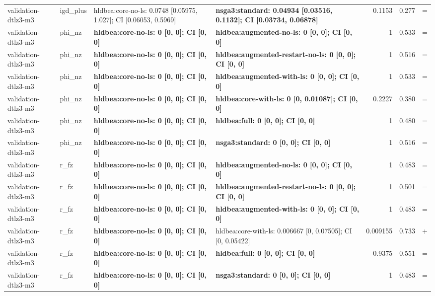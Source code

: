 \begin{tabular}{llllrrc}
validation-dtlz3-m3 & igd\_plus & hldbea:core-no-ls: 0.0748 [0.05975, 1.027]; CI [0.06053, 0.5969] & \textbf{nsga3:standard: 0.04934 [0.03516, 0.1132]; CI [0.03734, 0.06878]} & 0.1153 & 0.277 & = \\
validation-dtlz3-m3 & phi\_nz & \textbf{hldbea:core-no-ls: 0 [0, 0]; CI [0, 0]} & \textbf{hldbea:augmented-no-ls: 0 [0, 0]; CI [0, 0]} & 1 & 0.533 & = \\
validation-dtlz3-m3 & phi\_nz & \textbf{hldbea:core-no-ls: 0 [0, 0]; CI [0, 0]} & \textbf{hldbea:augmented-restart-no-ls: 0 [0, 0]; CI [0, 0]} & 1 & 0.516 & = \\
validation-dtlz3-m3 & phi\_nz & \textbf{hldbea:core-no-ls: 0 [0, 0]; CI [0, 0]} & \textbf{hldbea:augmented-with-ls: 0 [0, 0]; CI [0, 0]} & 1 & 0.533 & = \\
validation-dtlz3-m3 & phi\_nz & \textbf{hldbea:core-no-ls: 0 [0, 0]; CI [0, 0]} & \textbf{hldbea:core-with-ls: 0 [0, 0.01087]; CI [0, 0]} & 0.2227 & 0.380 & = \\
validation-dtlz3-m3 & phi\_nz & \textbf{hldbea:core-no-ls: 0 [0, 0]; CI [0, 0]} & \textbf{hldbea:full: 0 [0, 0]; CI [0, 0]} & 1 & 0.480 & = \\
validation-dtlz3-m3 & phi\_nz & \textbf{hldbea:core-no-ls: 0 [0, 0]; CI [0, 0]} & \textbf{nsga3:standard: 0 [0, 0]; CI [0, 0]} & 1 & 0.516 & = \\
validation-dtlz3-m3 & r\_fz & \textbf{hldbea:core-no-ls: 0 [0, 0]; CI [0, 0]} & \textbf{hldbea:augmented-no-ls: 0 [0, 0]; CI [0, 0]} & 1 & 0.483 & = \\
validation-dtlz3-m3 & r\_fz & \textbf{hldbea:core-no-ls: 0 [0, 0]; CI [0, 0]} & \textbf{hldbea:augmented-restart-no-ls: 0 [0, 0]; CI [0, 0]} & 1 & 0.501 & = \\
validation-dtlz3-m3 & r\_fz & \textbf{hldbea:core-no-ls: 0 [0, 0]; CI [0, 0]} & \textbf{hldbea:augmented-with-ls: 0 [0, 0]; CI [0, 0]} & 1 & 0.483 & = \\
validation-dtlz3-m3 & r\_fz & \textbf{hldbea:core-no-ls: 0 [0, 0]; CI [0, 0]} & hldbea:core-with-ls: 0.006667 [0, 0.07505]; CI [0, 0.05422] & 0.009155 & 0.733 & + \\
validation-dtlz3-m3 & r\_fz & \textbf{hldbea:core-no-ls: 0 [0, 0]; CI [0, 0]} & \textbf{hldbea:full: 0 [0, 0]; CI [0, 0]} & 0.9375 & 0.551 & = \\
validation-dtlz3-m3 & r\_fz & \textbf{hldbea:core-no-ls: 0 [0, 0]; CI [0, 0]} & \textbf{nsga3:standard: 0 [0, 0]; CI [0, 0]} & 1 & 0.483 & = \\
\bottomrule
\end{tabular}
